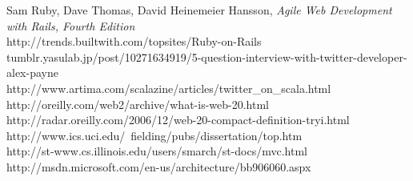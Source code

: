 \begin{thebibliography}{99}
   Sam Ruby, Dave Thomas, David Heinemeier Hansson, \emph{Agile Web Development with Rails, Fourth Edition}\\
    http://trends.builtwith.com/topsites/Ruby-on-Rails\\
   tumblr.yasulab.jp/post/10271634919/5-question-interview-with-twitter-developer-alex-payne\\
   http://www.artima.com/scalazine/articles/twitter\_on\_scala.html\\
   http://oreilly.com/web2/archive/what-is-web-20.html\\
   http://radar.oreilly.com/2006/12/web-20-compact-definition-tryi.html\\
   http://www.ics.uci.edu/~fielding/pubs/dissertation/top.htm\\
   http://st-www.cs.illinois.edu/users/smarch/st-docs/mvc.html\\
   http://msdn.microsoft.com/en-us/architecture/bb906060.aspx\\

\end{thebibliography}




